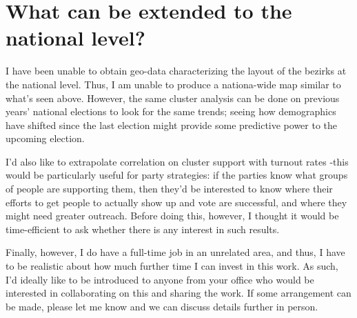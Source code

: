 \documentclass[amsmath,amssymb,nofootinbib,12pt,preprint]{revtex4}
\begin{document}
\section{What can be extended to the national level?}

I have been unable to obtain geo-data characterizing the layout of the bezirks at the national level. Thus, I am unable to produce a nationa-wide map similar to what's seen above. However, the same cluster analysis can be done on previous years' national elections to look for the same trends; seeing how demographics have shifted since the last election might provide some predictive power to the upcoming election.

I'd also like to extrapolate correlation on cluster support with turnout rates \--this would be particularly useful for party strategies: if the parties know what groups of people are supporting them, then they'd be interested to know where their efforts to get people to actually show up and vote are successful, and where they might need greater outreach. Before doing this, however, I thought it would be time-efficient to ask whether there is any interest in such results.

Finally, however, I do have a full-time job in an unrelated area, and thus, I have to be realistic about how much further time I can invest in this work. As such, I'd ideally like to be introduced to anyone from your office who would be interested in collaborating on this and sharing the work. If some arrangement can be made, please let me know and we can discuss details further in person.


\begin{thebibliography}{10}


\end{thebibliography}
\end{document}
